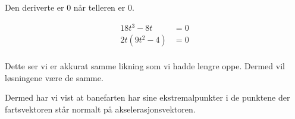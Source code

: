 \begin{easylist}[enumerate]
		Den deriverte er 0 når telleren er 0.
		
		\begin{equation*}
			\begin{aligned}
				18t^3 - 8t & = 0 \\
				2t(9t^2 -4) & = 0 \\
			\end{aligned}
		\end{equation*}
		
		Dette ser vi er akkurat samme likning som vi hadde lengre oppe. Dermed vil løsningene være de samme. 
		
		Dermed har vi vist at banefarten har sine ekstremalpunkter i de punktene der fartsvektoren står normalt på akselerasjonsvektoren.
		
	
\end{easylist}




